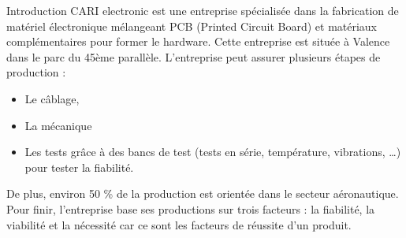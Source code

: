 \documentclass[11pt]{report}
\begin{document}
\maketitle
\setcounter{page}{0}
\newpage


\LARGE Introduction
\newline
\newline \large CARI electronic est une entreprise spécialisée dans la fabrication de matériel électronique mélangeant PCB (Printed Circuit Board) et matériaux complémentaires pour former le hardware. Cette entreprise est située à Valence dans le parc du 45ème parallèle. L’entreprise peut assurer plusieurs étapes de production :
    \begin{itemize}
        \item Le câblage,
        \item La mécanique
        \item Les tests grâce à des bancs de test (tests en série, température, vibrations, …) pour tester la fiabilité.  
    \end{itemize}
    De plus, environ 50 \% de la production est orientée dans le secteur aéronautique. Pour finir, l’entreprise base ses productions sur trois facteurs : la fiabilité, la viabilité et la nécessité car ce sont les facteurs de réussite d’un produit.

\newpage


\end{document}
